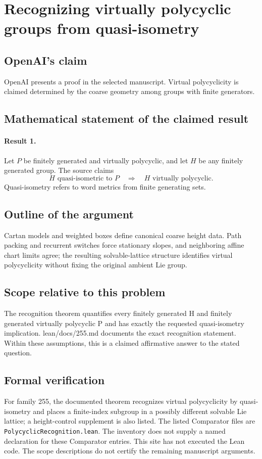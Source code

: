 \documentclass[11pt]{article}
\begin{document}
\section*{Recognizing virtually polycyclic groups from quasi-isometry}

\subsection{OpenAI's claim}
OpenAI presents a proof in the selected manuscript. Virtual polycyclicity is claimed determined by the coarse geometry among groups with finite generators.

\subsection{Mathematical statement of the claimed result}
\paragraph{Result 1.} Let \(P\) be finitely generated and virtually polycyclic, and let \(H\) be any finitely generated group. The source claims
\[
 H\text{ quasi-isometric to }P\quad\Longrightarrow\quad H\text{ virtually polycyclic}.
\]
Quasi-isometry refers to word metrics from finite generating sets.

\subsection{Outline of the argument}
Cartan models and weighted boxes define canonical coarse height data. Path packing and recurrent switches force stationary slopes, and neighboring affine chart limits agree; the resulting solvable-lattice structure identifies virtual polycyclicity without fixing the original ambient Lie group.

\subsection{Scope relative to this problem}
The recognition theorem quantifies every finitely generated H and finitely generated virtually polycyclic P and has exactly the requested quasi-isometry implication. lean/docs/255.md documents the exact recognition statement. Within these assumptions, this is a claimed affirmative answer to the stated question.

\subsection{Formal verification}
For family 255, the documented theorem recognizes virtual polycyclicity by quasi-isometry and places a finite-index subgroup in a possibly different solvable Lie lattice; a height-control supplement is also listed. The listed Comparator files are \texttt{PolycyclicRecognition.lean}. The inventory does not supply a named declaration for these Comparator entries. This site has not executed the Lean code. The scope descriptions do not certify the remaining manuscript arguments.
\end{document}
